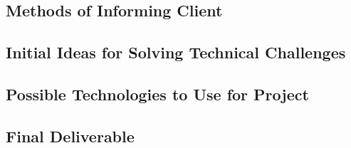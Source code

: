 \documentclass{article}
\begin{document}
	\subsection{Methods of Informing Client}
	\subsection{Initial Ideas for Solving Technical Challenges}
	\subsection{Possible Technologies to Use for Project}
	\subsection{Final Deliverable}
\end{document}
